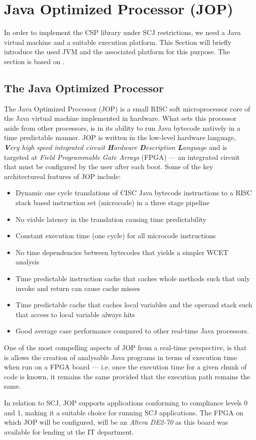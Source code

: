 \chapter{Java Optimized Processor (JOP)}
\label{chapter:jop}
In order to implement the CSP library under SCJ restrictions, we need a Java virtual machine and a suitable execution platform. This Section will briefly introduce the used JVM and the associated platform for this purpose. The section is based on \cite{Schoeberl_ajava, JOPDesign, jop:handbook}.

\section{The Java Optimized Processor}
The Java Optimized Processor (JOP) is a small RISC soft microprocessor core of the Java virtual machine implemented in hardware. What sets this processor aside from other processors, is in its ability to run Java bytecode natively in a time predictable manner. JOP is written in the low-level hardware language, \textit{\textbf{V}ery high speed integrated circuit \textbf{H}ardware \textbf{D}escription \textbf{L}anguage} and is targeted at \textit{Field Programmable Gate Arrays} (FPGA) --- an integrated circuit that must be configured by the user after each boot. Some of the key architectureal features of JOP include:

\begin{itemize}
 	\item Dynamic one cycle translations of CISC Java bytecode instructions to a RISC stack based instruction set (microcode) in a three stage pipeline
 	\item No viable latency in the translation causing time predictability
 	\item Constant execution time (one cycle) for all microcode instructions
 	\item No time dependencies between bytecodes that yields a simpler WCET analysis
 	\item Time predictable instruction cache that caches whole methods such that only invoke and return can cause cache misses
 	\item Time predictable cache that caches local variables and the operand stack such that access to local variable always hits
 	\item Good average case performance compared to other real-time Java processors.
\end{itemize}

One of the most compelling aspects of JOP from a real-time perspective, is that is allows the creation of analysable Java programs in terms of execution time when run on a FPGA board --- i.e. once the execution time for a given chunk of code is known, it remains the same provided that the execution path remains the same.

In relation to SCJ, JOP supports applications conforming to compliance levels 0 and 1, making it a suitable choice for running SCJ applications. The FPGA on which JOP will be configured, will be an \textit{Altera DE2-70} as this board was available for lending at the IT department.